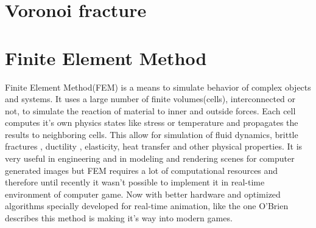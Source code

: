 \section{Voronoi fracture}

\section{Finite Element Method}
Finite Element Method(FEM) is a means to simulate behavior of complex objects and systems.  It uses a large number of finite volumes(cells), interconnected or not, to simulate the reaction of material to inner and outside forces. Each cell computes it's own physics states like stress or temperature and propagates the results to neighboring cells. This allow for simulation of fluid dynamics, brittle fractures \cite{brittlefracture}, ductility \cite{ductilefracture}, elasticity, heat transfer and other physical properties. It is very useful in engineering and in modeling and rendering scenes for computer generated images but FEM requires a lot of computational resources and therefore until recently it wasn't possible to implement it in real-time environment of computer game. Now with better hardware and optimized algorithms specially developed for real-time animation, like the one O'Brien \cite{femingames} describes this method is making it's way into modern games.




